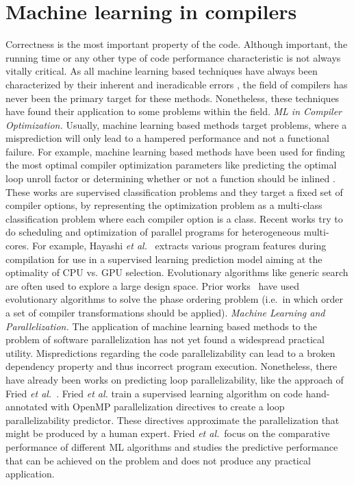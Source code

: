 \section{Machine learning in compilers}
\label{related_work_ml}
\quad Correctness is the most important property of the code. Although important, the running time or any other type of code performance characteristic is not always vitally critical. As all machine learning based techniques have always been characterized by their inherent and ineradicable errors \cite{James:2013:ISL:2517747}, the field of compilers has never been the primary target for these methods. Nonetheless, these techniques have found their application to some problems within the field.\newline\null
\textit{ML in Compiler Optimization.}
Usually, machine learning based methods target problems, where a misprediction will only lead to a hampered performance and not a functional failure. For example, machine learning based methods have been used for finding the most optimal compiler optimization parameters like predicting the optimal loop unroll factor \cite{4907653,1402082} or determining whether or not a function should be inlined \cite{Zhao2003ToIO,1559966}. These works are supervised classification problems and they target a fixed set of compiler options, by representing the optimization problem as a multi-class classification problem where each compiler option is a class. Recent works try to do scheduling and optimization of parallel programs for heterogeneous multi-cores. For example, Hayashi \emph{et al.}~\cite{Hayashi:2015:MPH:2807426.2807429} extracts various program features during compilation for use in a supervised learning prediction model aiming at the optimality of CPU vs. GPU selection. Evolutionary algorithms like generic search are often used to explore a large design space. Prior works~\cite{Almagor:2004:FEC:997163.997196,Cooper:2005:AAC:1065910.1065921,Ashouri:2017:MMC:3132652.3124452} have used evolutionary algorithms to solve the phase ordering problem (i.e.\ in which order a set of compiler transformations should be applied).\newline\null
\textit{Machine Learning and Parallelization.}
The application of machine learning based methods to the problem of software parallelization has not yet found a widespread practical utility. Mispredictions regarding the code parallelizability can lead to a broken dependency property and thus incorrect program execution. Nonetheless, there have already been works on predicting loop parallelizability, like the approach of Fried \emph{et al.}~\cite{fried_ea:2013:icmla}. Fried \emph{et al.} train a supervised learning algorithm on code hand-annotated with OpenMP parallelization directives to create a loop parallelizability predictor. These directives approximate the parallelization that might be produced by a human expert. Fried \emph{et al.}~focus on the comparative performance of different ML algorithms and studies the predictive performance that can be achieved on the problem and does not produce any practical application.\newline\null
